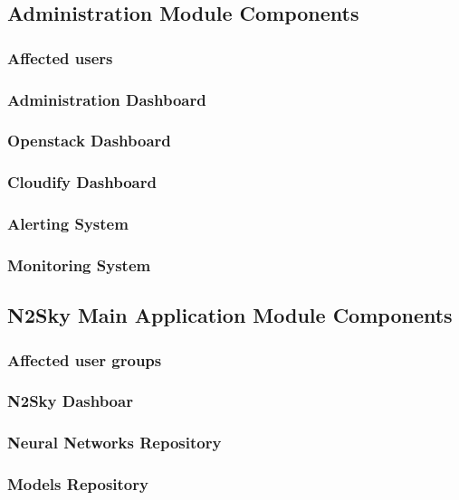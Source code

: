\subsection{Administration Module Components}\label{Administration components}
\subsubsection{Affected users}\label{Affected users}
\subsubsection{Administration Dashboard}\label{Administration Dashboard}
\subsubsection{Openstack Dashboard}\label{Openstack Dashboard}
\subsubsection{Cloudify Dashboard}\label{Cloudify Dashboard}
\subsubsection{Alerting System}\label{Alerting System}
\subsubsection{Monitoring System}\label{Monitoring System}

\subsection{N2Sky Main Application Module Components}\label{N2Sky Components}
\subsubsection{Affected user groups}\label{Affected user groups 2}
\subsubsection{N2Sky Dashboar}\label{N2Sky Dashboar}
\subsubsection{Neural Networks Repository}\label{Neural Networks Repository}
\subsubsection{Models Repository}\label{Models Repository}
